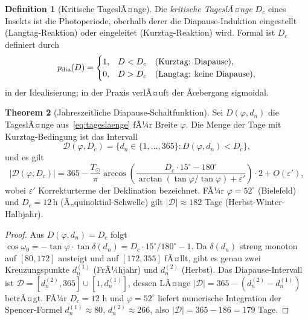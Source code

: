 ﻿\documentclass[12pt, a4paper]{article}
\theoremstyle{definition}
\newtheorem{theorem}{Theorem}[section]
\newtheorem{definition}[theorem]{Definition}
\begin{document}
\begin{definition}[Kritische TageslÃ¤nge]\label{def:kritisch-tl}
Die \emph{kritische TageslÃ¤nge} $D_c$ eines Insekts ist die Photoperiode,
oberhalb derer die Diapause-Induktion eingestellt (Langtag-Reaktion) oder
eingeleitet (Kurztag-Reaktion) wird. Formal ist $D_c$ definiert durch
\begin{equation}\label{eq:diapause}
  p_{\rm dia}(D) = \begin{cases}
    1, & D < D_c \quad(\text{Kurztag: Diapause}), \\
    0, & D > D_c \quad(\text{Langtag: keine Diapause}),
  \end{cases}
\end{equation}
in der Idealisierung; in der Praxis verlÃ¤uft der Ãœbergang sigmoidal.
\end{definition}

\begin{theorem}[Jahreszeitliche Diapause-Schaltfunktion]\label{thm:diapause}
Sei $D(\varphi, d_n)$ die TageslÃ¤nge aus~\eqref{eq:tageslaenge} fÃ¼r Breite
$\varphi$. Die Menge der Tage mit Kurztag-Bedingung ist das Intervall
\begin{equation}\label{eq:diapause-interval}
  \mathcal{D}(\varphi, D_c) = \bigl\{d_n \in \{1,\ldots,365\} : D(\varphi, d_n) < D_c\bigr\},
\end{equation}
und es gilt
\[
  |\mathcal{D}(\varphi, D_c)| = 365 - \frac{T_{\odot}}{\pi}\arccos\!\left(\frac{D_c\cdot 15^\circ - 180^\circ}
  {\arctan(\tan\varphi/\tan\varphi) + \varepsilon'}\right) \cdot 2 + O(\varepsilon'),
\]
wobei $\varepsilon'$ Korrekturterme der Deklination bezeichnet.
FÃ¼r $\varphi = 52^\circ$ (Bielefeld) und $D_c = 12\,\text{h}$ (Ã„quinoktial-Schwelle)
gilt $|\mathcal{D}| \approx 182$ Tage (Herbst-Winter-Halbjahr).
\end{theorem}

\begin{proof}
Aus $D(\varphi, d_n) = D_c$ folgt $\cos\omega_0 = -\tan\varphi\cdot\tan\delta(d_n) = D_c\cdot 15^\circ/180^\circ - 1$.
Da $\delta(d_n)$ streng monoton auf $[80, 172]$ ansteigt und auf $[172, 355]$ fÃ¤llt,
gibt es genau zwei Kreuzungspunkte $d_n^{(1)}$ (FrÃ¼hjahr) und $d_n^{(2)}$ (Herbst).
Das Diapause-Intervall ist $\mathcal{D} = [d_n^{(2)}, 365] \cup [1, d_n^{(1)}]$, dessen
LÃ¤nge $|\mathcal{D}| = 365 - (d_n^{(2)} - d_n^{(1)})$ betrÃ¤gt. FÃ¼r $D_c = 12$ h und
$\varphi = 52^\circ$ liefert numerische Integration der Spencer-Formel
$d_n^{(1)} \approx 80$, $d_n^{(2)} \approx 266$, also $|\mathcal{D}| = 365 - 186 = 179$ Tage. \hfill
\end{proof}
\end{document}
